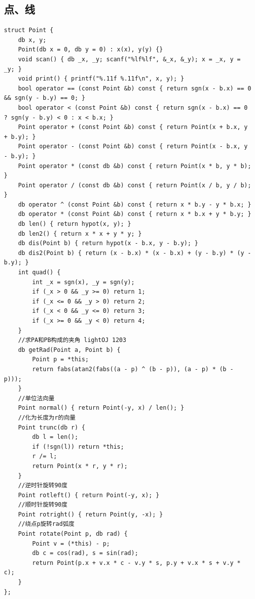 \subsection{点、线}
\begin{lstlisting}
struct Point {
	db x, y;
	Point(db x = 0, db y = 0) : x(x), y(y) {}
	void scan() { db _x, _y; scanf("%lf%lf", &_x, &_y); x = _x, y = _y; }
	void print() { printf("%.11f %.11f\n", x, y); }
	bool operator == (const Point &b) const { return sgn(x - b.x) == 0 && sgn(y - b.y) == 0; }
	bool operator < (const Point &b) const { return sgn(x - b.x) == 0 ? sgn(y - b.y) < 0 : x < b.x; }
	Point operator + (const Point &b) const { return Point(x + b.x, y + b.y); }
	Point operator - (const Point &b) const { return Point(x - b.x, y - b.y); }
	Point operator * (const db &b) const { return Point(x * b, y * b); }
	Point operator / (const db &b) const { return Point(x / b, y / b); }
	db operator ^ (const Point &b) const { return x * b.y - y * b.x; }
	db operator * (const Point &b) const { return x * b.x + y * b.y; }
	db len() { return hypot(x, y); }
	db len2() { return x * x + y * y; }
	db dis(Point b) { return hypot(x - b.x, y - b.y); }
	db dis2(Point b) { return (x - b.x) * (x - b.x) + (y - b.y) * (y - b.y); }
	int quad() {
		int _x = sgn(x), _y = sgn(y);
		if (_x > 0 && _y >= 0) return 1;
		if (_x <= 0 && _y > 0) return 2;
		if (_x < 0 && _y <= 0) return 3;
		if (_x >= 0 && _y < 0) return 4;
	}
	//求PA和PB构成的夹角 lightOJ 1203
	db getRad(Point a, Point b) {
		Point p = *this;
		return fabs(atan2(fabs((a - p) ^ (b - p)), (a - p) * (b - p)));
	}
	//单位法向量
	Point normal() { return Point(-y, x) / len(); }
	//化为长度为r的向量
	Point trunc(db r) {
		db l = len();
		if (!sgn(l)) return *this;
		r /= l;
		return Point(x * r, y * r);
	}
	//逆时针旋转90度
	Point rotleft() { return Point(-y, x); }
	//顺时针旋转90度
	Point rotright() { return Point(y, -x); }
	//绕点p旋转rad弧度
	Point rotate(Point p, db rad) {
		Point v = (*this) - p;
		db c = cos(rad), s = sin(rad);
		return Point(p.x + v.x * c - v.y * s, p.y + v.x * s + v.y * c);
	}
};


\end{lstlisting}
